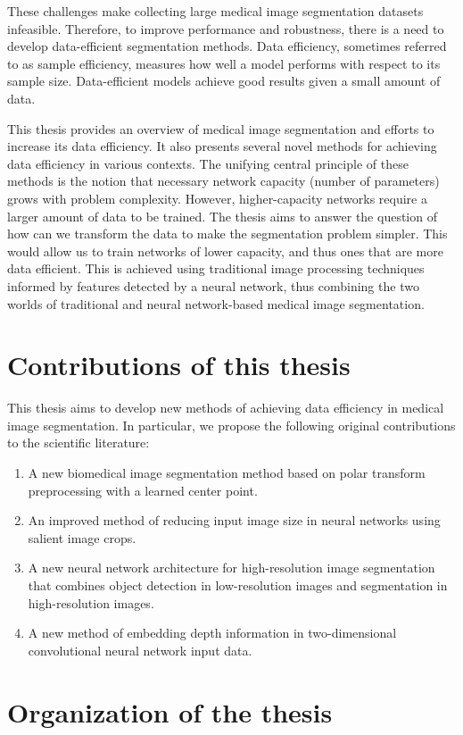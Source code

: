 These challenges make collecting large medical image segmentation datasets infeasible. Therefore, to improve performance and robustness, there is a need to develop data-efficient segmentation methods. Data efficiency, sometimes referred to as sample efficiency, measures how well a model performs with respect to its sample size. Data-efficient models achieve good results given a small amount of data.

This thesis provides an overview of medical image segmentation and efforts to increase its data efficiency. It also presents several novel methods for achieving data efficiency in various contexts. The unifying central principle of these methods is the notion that necessary network capacity (number of parameters) grows with problem complexity. However, higher-capacity networks require a larger amount of data to be trained. The thesis aims to answer the question of how can we transform the data to make the segmentation problem simpler. This would allow us to train networks of lower capacity, and thus ones that are more data efficient. This is achieved using traditional image processing techniques informed by features detected by a neural network, thus combining the two worlds of traditional and neural network-based medical image segmentation.

\section{Contributions of this thesis}

This thesis aims to develop new methods of achieving data efficiency in medical image segmentation. In particular, we propose the following original contributions to the scientific literature:

\begin{enumerate}
	\item A new biomedical image segmentation method based on polar transform preprocessing with a learned center point.
	\item An improved method of reducing input image size in neural networks using salient image crops.
	\item A new neural network architecture for high-resolution image segmentation that combines object detection in low-resolution images and segmentation in high-resolution images.
	\item A new method of embedding depth information in two-dimensional convolutional neural network input data.
\end{enumerate}

\section{Organization of the thesis}




